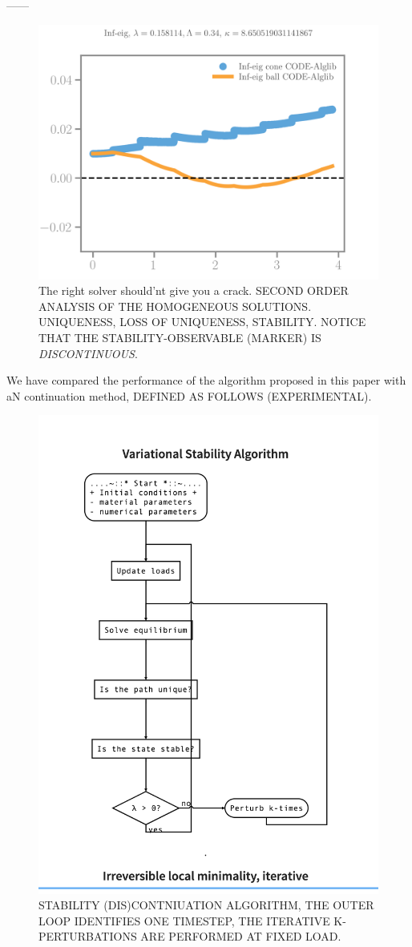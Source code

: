 ------



\begin{figure}[htbp]
    \centering
    \includegraphics*[width=.7\textwidth]{../images/irreversibility_inf_eig.png}
    \caption{The right solver should'nt give you a crack.
    SECOND ORDER ANALYSIS OF THE HOMOGENEOUS SOLUTIONS. UNIQUENESS, LOSS OF UNIQUENESS, STABILITY. NOTICE THAT THE STABILITY-OBSERVABLE (MARKER) IS \emph{DISCONTINUOUS}.
    }
    \label{fig:shouldnt}
\end{figure}

We have compared the performance of the algorithm proposed in this paper with aN continuation method, DEFINED AS FOLLOWS (EXPERIMENTAL). 


\begin{figure}[htbp]
    \centering
    \includegraphics*[width=.7\textwidth]{../images/VSA*.png}
    \caption{STABILITY (DIS)CONTNIUATION ALGORITHM, THE OUTER LOOP IDENTIFIES ONE TIMESTEP, THE ITERATIVE K-PERTURBATIONS ARE PERFORMED AT FIXED LOAD.}
    \label{fig:shouldnt}
\end{figure}

